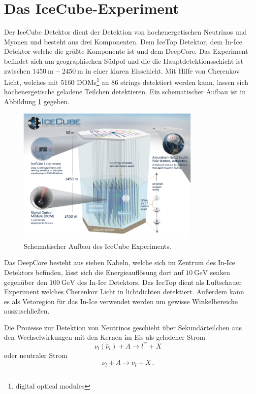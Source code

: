 \section{Das IceCube-Experiment}
\label{sec:detector}
Der IceCube Detektor dient der Detektion von hochenergetischen  Neutrinos und Myonen und besteht aus drei Komponenten. Dem IceTop Detektor, dem In-Ice Detektor welche die gr\"o\ss te Komponente ist und dem DeepCore.
Das Experiment befindet aich am geographischen S\"udpol und die die Hauptdetektionsschicht ist zwischen $\SI{1450}{\meter} - \SI{2450}{\meter}$ in einer klaren Eisschicht.
Mit Hilfe von Cherenkov Licht, welches mit 5160 DOMs\footnote{digital optical modules} an 86 strings detektiert werden kann, lassen sich hochenergetische geladene Teilchen detektieren.
Ein schematischer Aufbau ist in Abbildung \ref{fig:cube} gegeben.

\begin{figure}
  \centering
  \includegraphics[width=0.8\textwidth]{plots/icecube_detector_sm.png}
  \caption{Schematischer Aufbau des IceCube Experiments.}
  \label{fig:cube}
\end{figure}

Das DeepCore besteht aus sieben Kabeln, welche sich im Zentrum des In-Ice Detektors befinden, l\"asst sich die Energieaufl\"osung dort auf $\SI{10}{\giga\electronvolt}$ senken gegen\"uber den $\SI{100}{\giga\electronvolt}$ des In-Ice Detektors.
Das IceTop dient als Luftschauer Experiment welches Cherenkov Licht in lichtdichten detektiert. Au\ss erdem kann es als Vetoregion f\"ur das In-Ice verwendet werden um gewisse Winkelbereiche auszuschlie\ss en.

Die Prozesse zur Detektion von Neutrinos geschieht \"uber Sekund\"arteilchen aus den Wechselwirkungen mit den Kernen im Eis als geladener Strom
\begin{equation*}
  \nu_l (\bar{\nu}_l) + A \to l^{\mp} + X
\end{equation*}
oder neutraler Strom
\begin{equation*}
  \nu_l + A \to \nu_l + X\,.
\end{equation*}

